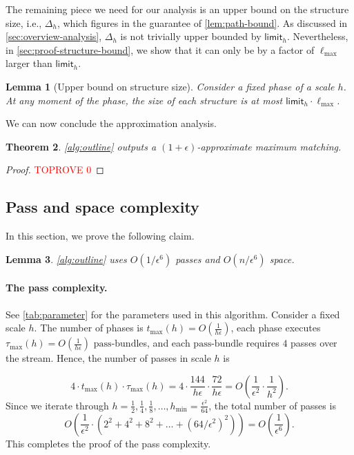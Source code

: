 \documentclass{article}
\newcommand{\eps}{\epsilon}
\newcommand{\lmax}{\ell_{\max}}
\newcommand{\tmax}{t_{\max}}
\newcommand{\hmin}{h_{\min}}
\newcommand{\taumax}{\tau_{\max}}
\newcommand{\bundle}{\text{pass-bundle}\xspace}
\newcommand{\limit}{\mathsf{limit}}
\newtheorem{theorem}{Theorem}[section]
\newtheorem{lemma}[theorem]{Lemma}
\newcommand{\rb}[1]{\left( #1 \right)}
\begin{document}
The remaining piece we need for our analysis is an upper bound on the structure size, i.e., $\Delta_h$, which figures in the guarantee of \cref{lem:path-bound}. As discussed in \cref{sec:overview-analysis}, $\Delta_h$ is not trivially upper bounded by $\limit_h$.
Nevertheless, in \cref{sec:proof-structure-bound}, we show that it can only be by a factor of $\lmax$ larger than $\limit_h$.
\begin{lemma}[Upper bound on structure size] \label{lem:structure-bound} 
Consider a fixed phase of a scale $h$. At any moment of the phase, the size of each structure is at most $\limit_h \cdot \lmax$. \end{lemma}

We can now conclude the approximation analysis.
\begin{theorem}
    \cref{alg:outline} outputs a $(1+\eps)$-approximate maximum matching.
\end{theorem}
\begin{proof}\textcolor{red}{TOPROVE 0}\end{proof}

\subsection{Pass and space complexity}
In this section, we prove the following claim.
\begin{lemma}
    \cref{alg:outline} uses $O\rb{1/\eps^6}$ passes and $O\rb{n/\eps^6}$ space.
\end{lemma}


\paragraph{The pass complexity.}
See \cref{tab:parameter} for the parameters used in this algorithm. 
Consider a fixed scale $h$. The number of phases is $\tmax(h) = O(\frac{1}{h \eps})$, each phase executes $\taumax(h) = O(\frac{1}{h \eps})$ $\bundle$s, and each $\bundle$ requires $4$ passes over the stream. Hence, the number of passes in scale $h$ is

\[  
    4 \cdot \tmax(h) \cdot \taumax(h) = 
    4 \cdot \frac{144}{h \eps} \cdot \frac{72}{h \eps} = O\rb{\frac{1}{\eps^2} \cdot \frac{1}{h^2}}.
\]
Since we iterate through $h = \frac{1}{2}, \frac{1}{4}, \frac{1}{8}, \dots, \hmin = \frac{\eps^2}{64}$, the total number of passes is
\[
    O\rb{\frac{1}{\eps^2} \cdot (2^2 + 4^2 + 8^2 + \dots + (64/\eps^2)^2)} = O\rb{\frac{1}{\eps^6}}.
\]
This completes the proof of the pass complexity.
\end{document}
